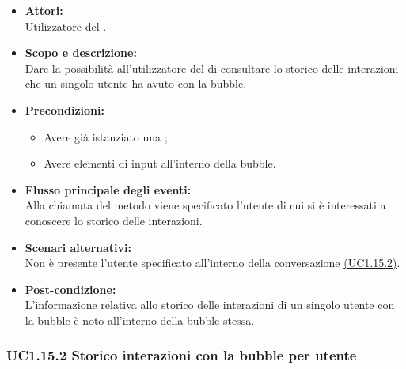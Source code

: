 \begin{itemize}
	\item \textbf{Attori:}
	\\Utilizzatore del .
	\item \textbf{Scopo e descrizione:} 
	\\Dare la possibilità all'utilizzatore del  di consultare lo storico delle interazioni che un singolo utente ha avuto con la bubble.
	\item \textbf{Precondizioni:}
	\begin{itemize}
		\item Avere già istanziato una ;
		\item Avere elementi di input all'interno della bubble.
	\end{itemize}
	\item \textbf{Flusso principale degli eventi:}
	\\Alla chiamata del metodo viene specificato l'utente di cui si è interessati a conoscere lo storico delle interazioni.
	\item \textbf{Scenari alternativi:}
	\\Non è presente l’utente specificato all’interno della conversazione \hyperref[UC1.15.2]{(UC1.15.2)}.
	\item \textbf{Post-condizione:}
	\\L'informazione relativa allo storico delle interazioni di un singolo utente con la bubble è noto all'interno della bubble stessa.
\end{itemize}

\subsubsection{UC1.15.2 Storico interazioni con la bubble per utente} \label{UC1.15.2}

